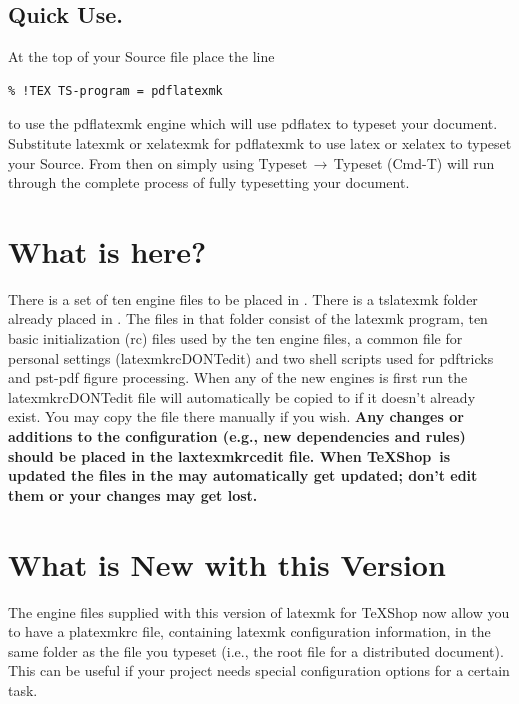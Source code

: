 \documentclass[11pt]{article}
\newcommand{\mnu}[1]{\textsf{#1}}
\newcommand{\cmd}[1]{\textsf{#1}}
\newcommand{\To}{\,\(\to\)\,}
\newcommand{\TS}{\textsf{\TeX Shop}}
\begin{document}
\subsection{Quick Use.}

At the top of your Source file place the line
\begin{verbatim}
% !TEX TS-program = pdflatexmk
\end{verbatim}
to use the \cmd{pdflatexmk} engine which will use \cmd{pdflatex} to typeset your document. Substitute \cmd{latexmk} or \cmd{xelatexmk} for \cmd{pdflatexmk} to use \cmd{latex} or \cmd{xelatex} to typeset your Source. From then on simply using \mnu{Typeset}\To\mnu{Typeset} (\cmd{Cmd-T}) will run through the complete process of fully typesetting your document.

\section{What is here?}

There is a set of ten \cmd{engine} files to be placed in . There is a \cmd{tslatexmk} folder already placed in . The files in that folder consist of the \cmd{latexmk} program, ten basic initialization (\cmd{rc}) files used by the ten \cmd{engine} files, a common file for personal settings (\cmd{latexmkrcDONTedit}) and two shell scripts used for \cmd{pdftricks} and \cmd{pst-pdf} figure processing. When any of the new engines is first run the \cmd{latexmkrcDONTedit} file will automatically be copied to  if it doesn't already exist. You may copy the file there manually if you wish. \textbf{Any changes or additions to the configuration (e.g., new dependencies and rules) should be placed in the \cmd{laxtexmkrcedit} file. When \TS\ is updated the files in the  may automatically get updated; don't edit them or your changes may get lost.}

\section{What is New with this Version}

The engine files supplied with this version of latexmk for TeXShop now allow you to have a \cmd{platexmkrc} file, containing \cmd{latexmk} configuration information, in the same folder as the file you typeset (i.e., the root file for a distributed document). This can be useful if your project needs special configuration options for a certain task.
\end{document}
